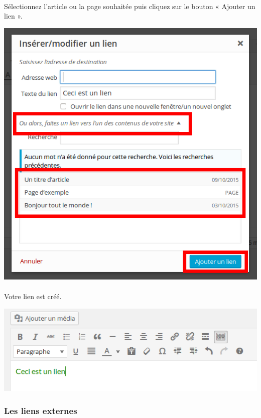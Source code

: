 \documentclass[10pt,a4paper]{article}
\begin{document}
\paragraph{}Sélectionnez l'article ou la page souhaitée puis cliquez sur le bouton « Ajouter un lien ».
\begin{center}
\includegraphics[scale=0.35]{img/0078.png}
\end{center}
\paragraph{}Votre lien est créé.
\begin{center}
\includegraphics[scale=0.35]{img/0079.png}
\end{center}
\subsubsection{Les liens externes}
\end{document}
